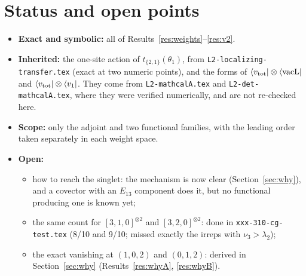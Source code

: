 \documentclass[11pt]{article}
\newcommand{\vacL}{\langle\mathrm{vacL}|}
\newcommand{\nb}[1]{\texttt{#1}}
\theoremstyle{definition}
\theoremstyle{remark}
\begin{document}
\section{Status and open points}
\begin{itemize}
\item \textbf{Exact and symbolic:} all of Results~\ref{res:weights}--\ref{res:v2}.
\item \textbf{Inherited:} the one-site action of $t_{\{2,1\}}(\theta_1)$, from \nb{L2-localizing-transfer.tex} (exact at two numeric points), and the forms of $\langle v_{\rm tot}|\otimes\vacL$ and $\langle v_{\rm tot}|\otimes\langle v_1|$. They come from \nb{L2-mathcalA.tex} and \nb{L2-det-mathcalA.tex}, where they were verified numerically, and are not re-checked here.
\item \textbf{Scope:} only the adjoint and two functional families, with the leading order taken separately in each weight space.
\item \textbf{Open:}
  \begin{itemize}
  \item how to reach the singlet: the mechanism is now clear (Section~\ref{sec:why}), and a covector with an $E_{13}$ component does it, but no functional producing one is known yet;
  \item the same count for $[3,1,0]^{\otimes2}$ and $[3,2,0]^{\otimes2}$: done in \nb{xxx-310-cg-test.tex} (8/10 and 9/10; missed exactly the irreps with $\nu_3>\lambda_2$);
  \item the exact vanishing at $(1,0,2)$ and $(0,1,2)$: derived in Section~\ref{sec:why} (Results~\ref{res:whyA}, \ref{res:whyB}).
  \end{itemize}
\end{itemize}
\end{document}
